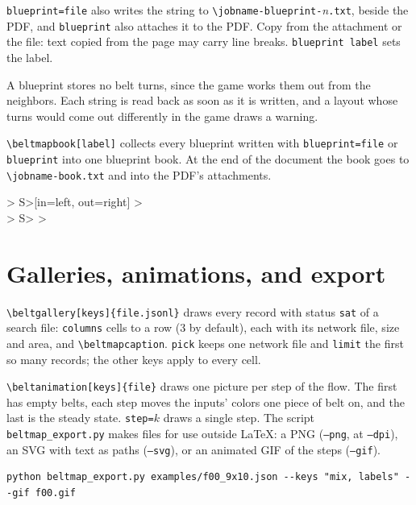 \documentclass[11pt]{article}
\newcommand\cs[1]{\texttt{\textbackslash#1}}
\newcommand\key[1]{\texttt{#1}}
\begin{document}
	\key{blueprint=file} also writes the string to \texttt{\textbackslash jobname-blueprint-}\emph{n}\texttt{.txt}, beside the PDF, and \key{blueprint} also attaches it to the PDF. Copy from the attachment or the file: text copied from the page may carry line breaks. \key{blueprint label} sets the label.

	A blueprint stores no belt turns, since the game works them out from the neighbors. Each string is read back as soon as it is written, and a layout whose turns would come out differently in the game draws a warning.

	\verb|\beltmapbook[label]| collects every blueprint written with \key{blueprint=file} or \key{blueprint} into one blueprint book. At the end of the document the book goes to \texttt{\textbackslash jobname-book.txt} and into the PDF's attachments.

	\begin{center}
		\begin{beltgrid}[mix, blueprint=none, tile=4.4mm]
			> S>[in=left, out=right] > \\
			> S> >
		\end{beltgrid}\par\smallskip
		\beltmapprintstring[0.6\linewidth]
	\end{center}

	\section{Galleries, animations, and export}

	\verb|\beltgallery[keys]{file.jsonl}| draws every record with status \texttt{sat} of a search file: \key{columns} cells to a row (3 by default), each with its network file, size and area, and \cs{beltmapcaption}. \key{pick} keeps one network file and \key{limit} the first so many records; the other keys apply to every cell.

	\verb|\beltanimation[keys]{file}| draws one picture per step of the flow. The first has empty belts, each step moves the inputs' colors one piece of belt on, and the last is the steady state. \key{step=}$k$ draws a single step. The script \texttt{beltmap\_export.py} makes files for use outside \LaTeX: a PNG (\texttt{--png}, at \texttt{--dpi}), an SVG with text as paths (\texttt{--svg}), or an animated GIF of the steps (\texttt{--gif}).

	\begin{Verbatim}[fontsize=\small]
python beltmap_export.py examples/f00_9x10.json --keys "mix, labels" --gif f00.gif
	\end{Verbatim}
\end{document}
